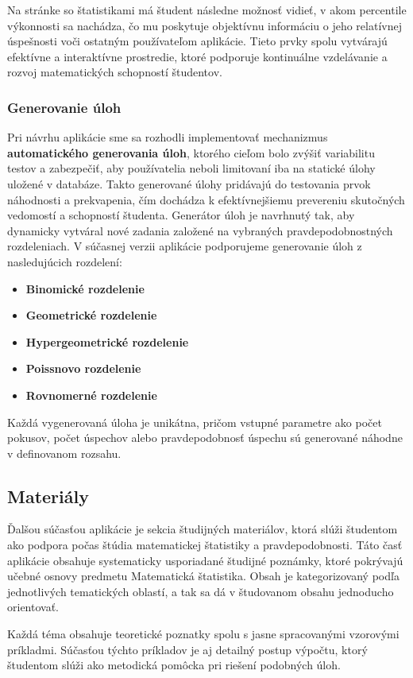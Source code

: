 Na stránke so štatistikami má študent následne možnosť vidieť, v akom percentile výkonnosti sa nachádza, čo mu poskytuje objektívnu informáciu o jeho relatívnej úspešnosti voči ostatným používateľom aplikácie. Tieto prvky spolu vytvárajú efektívne a interaktívne prostredie, ktoré podporuje kontinuálne vzdelávanie a rozvoj matematických schopností študentov.
\subsubsection{Generovanie úloh}

Pri návrhu aplikácie sme sa rozhodli implementovať mechanizmus \textbf{automatického generovania úloh}, ktorého cieľom bolo zvýšiť variabilitu testov a zabezpečiť, aby používatelia neboli limitovaní iba na statické úlohy uložené v databáze. 
Takto generované úlohy pridávajú do testovania prvok náhodnosti a prekvapenia, čím dochádza k efektívnejšiemu prevereniu skutočných vedomostí a schopností študenta.
Generátor úloh je navrhnutý tak, aby dynamicky vytváral nové zadania založené na vybraných pravdepodobnostných rozdeleniach. V súčasnej verzii aplikácie podporujeme generovanie úloh z nasledujúcich rozdelení:

\begin{itemize} \item \textbf{Binomické rozdelenie} \item \textbf{Geometrické rozdelenie} \item \textbf{Hypergeometrické rozdelenie} \item \textbf{Poissnovo rozdelenie} \item \textbf{Rovnomerné rozdelenie} \end{itemize}

Každá vygenerovaná úloha je unikátna, pričom vstupné parametre ako počet pokusov, počet úspechov alebo pravdepodobnosť úspechu sú generované náhodne v definovanom rozsahu.
\subsection{Materiály}
Ďalšou súčasťou aplikácie je sekcia študijných materiálov, ktorá slúži študentom ako podpora počas štúdia matematickej štatistiky a pravdepodobnosti. 
Táto časť aplikácie obsahuje systematicky usporiadané študijné poznámky, ktoré pokrývajú učebné osnovy predmetu Matematická štatistika.
 Obsah je kategorizovaný podľa jednotlivých tematických oblastí, a tak sa dá v študovanom obsahu jednoducho orientovať.

Každá téma obsahuje teoretické poznatky spolu s jasne spracovanými vzorovými príkladmi. 
Súčasťou týchto príkladov je aj detailný postup výpočtu, ktorý študentom slúži ako metodická pomôcka pri riešení podobných úloh.

